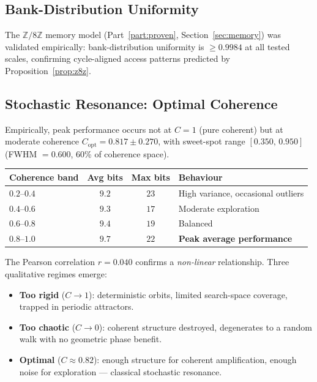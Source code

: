 \documentclass[12pt,a4paper]{article}
\theoremstyle{plain}
\theoremstyle{definition}
\theoremstyle{remark}
\newcommand{\Z}{\mathbb{Z}}
\begin{document}
\subsection{Bank-Distribution Uniformity}

The $\Z/8\Z$ memory model (Part~\ref{part:proven}, Section~\ref{sec:memory}) was validated
empirically: bank-distribution uniformity is $\ge 0.9984$ at all tested
scales, confirming cycle-aligned access patterns predicted by
Proposition~\ref{prop:z8z}.

\subsection{Stochastic Resonance: Optimal Coherence}

Empirically, peak performance occurs not at $C=1$ (pure coherent) but at
moderate coherence $C_{\mathrm{opt}} = 0.817 \pm 0.270$, with sweet-spot
range $[0.350,\,0.950]$ (FWHM $= 0.600$, 60\% of coherence space).

\begin{center}
\renewcommand{\arraystretch}{1.2}
\begin{tabular}{@{}lccl@{}}
\toprule
Coherence band & Avg bits & Max bits & Behaviour\\
\midrule
$0.2$--$0.4$ & $9.2$ & $23$ & High variance, occasional outliers\\
$0.4$--$0.6$ & $9.3$ & $17$ & Moderate exploration\\
$0.6$--$0.8$ & $9.4$ & $19$ & Balanced\\
$\mathbf{0.8}$--$\mathbf{1.0}$ & $\mathbf{9.7}$ & $22$
  & \textbf{Peak average performance}\\
\bottomrule
\end{tabular}
\end{center}

\noindent The Pearson correlation $r = 0.040$ confirms a \emph{non-linear}
relationship.  Three qualitative regimes emerge:
\begin{itemize}
  \item \textbf{Too rigid} ($C\to 1$): deterministic orbits,
        limited search-space coverage, trapped in periodic attractors.
  \item \textbf{Too chaotic} ($C\to 0$): coherent structure destroyed,
        degenerates to a random walk with no geometric phase benefit.
  \item \textbf{Optimal} ($C\approx 0.82$): enough structure for coherent
        amplification, enough noise for exploration — classical stochastic
        resonance.
\end{itemize}
\end{document}

